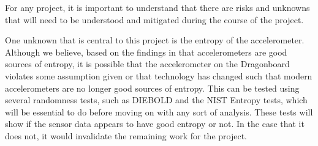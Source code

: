For any project, it is important to understand that there are risks and unknowns
that will need to be understood and mitigated during the course of the project. 

One unknown that is central to this project is the entropy of the accelerometer.
Although we believe, based on the findings in \cite{voris} that accelerometers
are good sources of entropy, it is possible that the accelerometer on the
Dragonboard violates some assumption given or that technology has changed such
that modern accelerometers are no longer good sources of entropy. This can be
tested using several randomness tests, such as DIEBOLD and the NIST Entropy
tests, which will be essential to do before moving on with any sort of analysis.
These tests will show if the sensor data appears to have good entropy or not.
In the case that it does not, it would invalidate the remaining work for the
project. 

